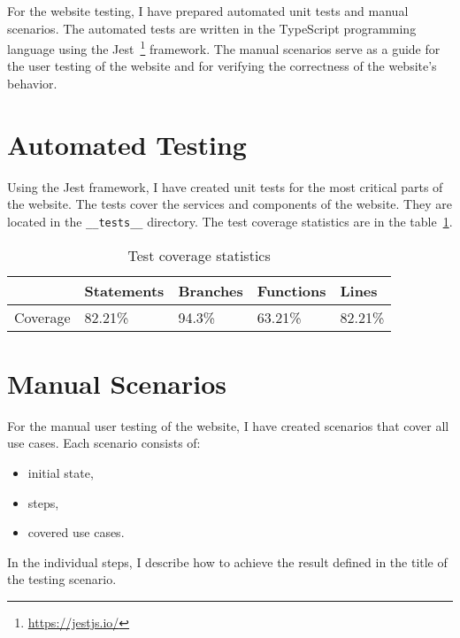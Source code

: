 For the website testing, I have prepared automated unit tests and manual scenarios.
The automated tests are written in the TypeScript programming language using the Jest~\footnote{\url{https://jestjs.io/}} framework.
The manual scenarios serve as a guide for the user testing of the website
and for verifying the correctness of the website's behavior.


\section{Automated Testing}
Using the Jest framework, I have created unit tests for the most critical parts of the website.
The tests cover the services and components of the website.
They are located in the \texttt{\_\_tests\_\_} directory.
The test coverage statistics are in the table~\ref{tab:tests-coverage}.

\begin{table}[hbt!]
    \centering
    \captionsetup{justification=centering}
    \begin{tabular}{|l|l|l|l|l|}
        \hline
        ~        & Statements & Branches & Functions & Lines   \\
        \hline
        Coverage & 82.21\%    & 94.3\%   & 63.21\%   & 82.21\% \\
        \hline
    \end{tabular}
    \caption{Test coverage statistics}
    \label{tab:tests-coverage}
\end{table}


\section{Manual Scenarios}
For the manual user testing of the website, I have created scenarios that cover all use cases.
Each scenario consists of:
\begin{itemize}
    \item initial state,
    \item steps,
    \item covered use cases.
\end{itemize}

In the individual steps, I describe how to achieve the result defined in the title of the testing scenario.

\newcommand{\testing}[1]{%
    \stepcounter{testingcounter}%
    \subsection{T\arabic{testingcounter} -- #1}
}


